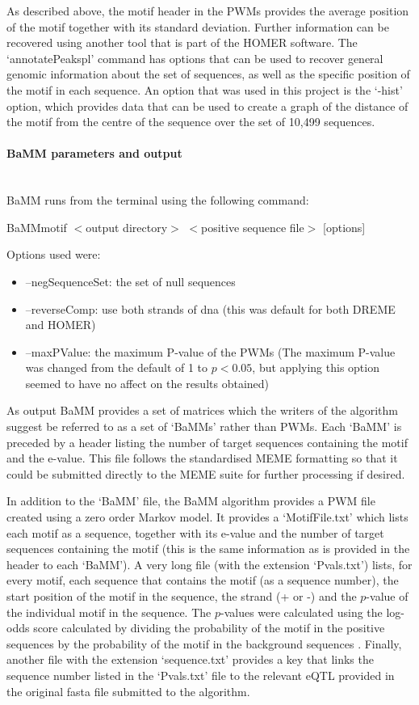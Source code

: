 \documentclass[12pt]{article}
\begin{document}
As described above, the motif header in the PWMs provides the average position of the motif together with its standard deviation. Further information can be recovered using another tool that is part of the HOMER software. The `annotatePeakspl' command has options that can be used to recover general genomic information about the set of sequences, as well as the specific position of the motif in each sequence. An option that was used in this project is the `-hist' option, which provides data that can be used to create a graph of the distance of the motif from the centre of the sequence over the set of 10,499 sequences.

\paragraph{BaMM parameters and output}\mbox{}\\
BaMM runs from the terminal using the following command:
\begin{center}
BaMMmotif $<$output directory$>$ $<$positive sequence file$>$ [options]
\end{center}
Options used were:
\begin{itemize}
\item --negSequenceSet: the set of null sequences
\item --reverseComp: use both strands of dna (this was default for both DREME and HOMER)
\item --maxPValue: the maximum P-value of the PWMs (The maximum P-value was changed from the default of 1 to $p<0.05$, but applying this option seemed to have no affect on the results obtained)
\end{itemize}

As output BaMM provides a set of matrices which the writers of the algorithm suggest be referred to as a set of `BaMMs' rather than PWMs. Each `BaMM' is preceded by a header listing the number of target sequences containing the motif and the e-value. This file follows the standardised MEME formatting so that it could be submitted directly to the MEME suite for further processing if desired.

In addition to the `BaMM' file, the BaMM algorithm provides a PWM file created using a zero order Markov model. It provides a `MotifFile.txt' which lists each motif as a sequence, together with its e-value and the number of target sequences containing the motif (this is the same information as is provided in the header to each `BaMM'). A very long file (with the extension `Pvals.txt') lists, for every motif, each sequence that contains the motif (as a sequence number), the start position of the motif in the sequence, the strand (+ or -) and the $p$-value of the individual motif in the sequence. The $p$-values were calculated using the log-odds score calculated by dividing the probability of the motif in the positive sequences by the probability of the motif in the background sequences \citep{siebert2016bayesian}. Finally, another file with the extension `sequence.txt' provides a key that links the sequence number listed in the `Pvals.txt' file to the relevant eQTL provided in the original fasta file submitted to the algorithm. 
\end{document}
